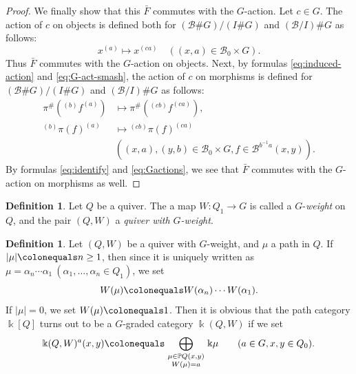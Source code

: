 \documentclass{surv-l}
\numberwithin{equation}{chapter}
\numberwithin{figure}{chapter}
\theoremstyle{plain}
\theoremstyle{definition}
\newtheorem{dfn}[thm]{Definition}
\theoremstyle{remark}
\def\smor(#1,#2,#3){{}^{(#1)}\!#2^{(#3)}}
\begin{document}
\begin{proof}
We finally show that this $\bar{F}$ commutes with the $G$-action.
Let $c \in G$.
The action of $c$ on objects is defined both for
$(\mathcal{B}\#G)/(I\# G)$ and $(\mathcal{B}/I)\# G$ as follows:
\[
x^{(a)} \mapsto x^{(ca)}\quad ((x,a) \in \mathcal{B}_0 \times G).
\]
Thus $\bar{F}$ commutes with the $G$-action on objects.
Next, by formulas \eqref{eq:induced-action} and \eqref{eq:G-act-smash},
the action of $c$ on morphisms is defined
for $(\mathcal{B}\#G)/(I\# G)$ and $(\mathcal{B}/I)\# G$ as follows:
\begin{equation}\label{eq:Gactions}
\begin{aligned}
\pi^\#(\smor(b,f,a))
&\mapsto
\pi^\#(\smor(cb,f,ca)),\\
\smor(b,{\pi(f)},a)
&\mapsto
\smor(cb,{\pi(f)},ca)\\
&((x, a), (y,b) \in \mathcal{B}_0 \times G, f \in \mathcal{B}^{b^{-1} a}(x, y)).
\end{aligned}
\end{equation}
By formulas \eqref{eq:identify} and \eqref{eq:Gactions},
we see that $\bar{F}$ commutes with the $G$-action on morphisms as well.
\end{proof}

\begin{dfn}
Let $Q$ be a quiver.
The a map $W\colon Q_1 \to G$ is called a $G$-\emph{weight} on $Q$,
and the pair $(Q, W)$ a \emph{quiver with $G$-weight}.
\end{dfn}

\begin{dfn}\label{dfn:omomi-grading}
Let $(Q, W)$ be a quiver with $G$-weight, and $\mu$ a path in $Q$.
If $|\mu|\colonequals  n \ge 1$, then since it is uniquely written as
$\mu = \alpha_n\cdots \alpha_1\ (\alpha_1, \dots, \alpha_n \in Q_1)$,
we set
\[
W(\mu)\colonequals  W(\alpha_n)\cdots W(\alpha_1).
\]
If $|\mu| = 0$, we set $W(\mu)\colonequals 1$.
Then it is obvious that the path category $\Bbbk[Q]$ turns out to be a $G$-graded category
$\Bbbk(Q, W)$ if we set
\[
\Bbbk(Q, W)^a(x, y)\colonequals  \bigoplus_{\begin{smallmatrix} \mu\in \mathbb{P} Q(x, y)\\W(\mu)=a \end{smallmatrix}}\Bbbk \mu \qquad (a \in G, x, y \in Q_0).
\]
\end{dfn}
\end{document}
